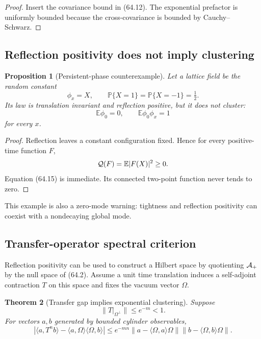 \documentclass[11pt]{article}
\newtheorem{theorem}{Theorem}[section]
\newtheorem{proposition}[theorem]{Proposition}
\begin{document}
\begin{proof}
Insert the covariance bound in (64.12).  The exponential prefactor is
uniformly bounded because the cross-covariance is bounded by
Cauchy--Schwarz.
\end{proof}

\subsection{Reflection positivity does not imply clustering}

\begin{proposition}[Persistent-phase counterexample]
\label{prop:v11v64-counterexample}
Let a lattice field be the random constant
\[
                              \phi_x=X,\qquad
                 \mathbb P\{X=1\}=\mathbb P\{X=-1\}=\tfrac12. \tag{64.14}
\]
Its law is translation invariant and reflection positive, but it does
not cluster:
\[
                    {\mathbb E}\phi_0=0,\qquad
                    {\mathbb E}\phi_0\phi_x=1                 \tag{64.15}
\]
for every \(x\).
\end{proposition}

\begin{proof}
Reflection leaves a constant configuration fixed.  Hence for every
positive-time function \(F\),
\[
                         {\cal Q}(F)={\mathbb E}|F(X)|^2\ge0.
\]
Equation (64.15) is immediate.  Its connected two-point function never
tends to zero.
\end{proof}

This example is also a zero-mode warning: tightness and reflection
positivity can coexist with a nondecaying global mode.

\subsection{Transfer-operator spectral criterion}

Reflection positivity can be used to construct a Hilbert space by
quotienting \({\cal A}_+\) by the null space of (64.2).  Assume a unit
time translation induces a self-adjoint contraction \(T\) on this
space and fixes the vacuum vector \(\Omega\).

\begin{theorem}[Transfer gap implies exponential clustering]
\label{thm:v11v64-transfer}
Suppose
\[
              \lVert T|_{\Omega^\perp}\rVert\le e^{-m}<1.     \tag{64.16}
\]
For vectors \(a,b\) generated by bounded cylinder observables,
\[
 |\langle a,T^nb\rangle
       -\langle a,\Omega\rangle\langle\Omega,b\rangle|
 \le e^{-mn}\lVert a-\langle\Omega,a\rangle\Omega\rVert
             \lVert b-\langle\Omega,b\rangle\Omega\rVert.     \tag{64.17}
\]
\end{theorem}
\end{document}
